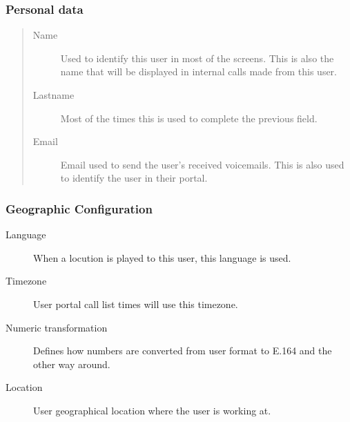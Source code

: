 \documentclass[letterpaper,10pt,english]{sphinxmanual}
\begin{document}
\subsubsection{Personal data}
\label{administration_portal/client/vpbx/users:personal-data}\begin{quote}
\begin{description}
\item[{Name}] \leavevmode
Used to identify this user in most of the screens. This is also the
name that will be displayed in internal calls made from this user.

\item[{Lastname}] \leavevmode
Most of the times this is used to complete the previous field.

\item[{Email}] \leavevmode
Email used to send the user's received voicemails. This is also used to
identify the user in their portal.

\end{description}
\end{quote}


\subsubsection{Geographic Configuration}
\label{administration_portal/client/vpbx/users:geographic-configuration}\begin{description}
\item[{Language}] \leavevmode{}\label{administration_portal/client/vpbx/users:term-language}
When a locution is played to this user, this language is used.

\item[{Timezone}] \leavevmode{}\label{administration_portal/client/vpbx/users:term-timezone}
User portal call list times will use this timezone.

\item[{Numeric transformation}] \leavevmode{}\label{administration_portal/client/vpbx/users:term-numeric-transformation}
Defines how numbers are converted from user format to E.164 and
the other way around.

\item[{Location}] \leavevmode{}\label{administration_portal/client/vpbx/users:term-location}
User geographical location where the user is working at.

\end{description}
\end{document}
